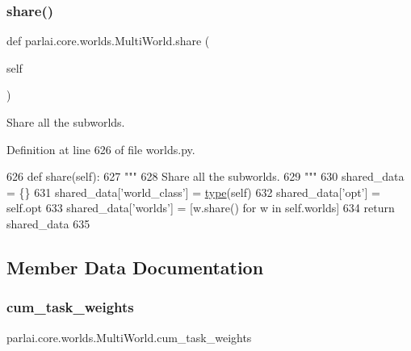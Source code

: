 \subsubsection{\texorpdfstring{share()}{share()}}
{\footnotesize\ttfamily def parlai.\+core.\+worlds.\+Multi\+World.\+share (\begin{DoxyParamCaption}\item[{}]{self }\end{DoxyParamCaption})}

\begin{DoxyVerb}Share all the subworlds.
\end{DoxyVerb}
 

Definition at line 626 of file worlds.\+py.


\begin{DoxyCode}
626     \textcolor{keyword}{def }share(self):
627         \textcolor{stringliteral}{"""}
628 \textcolor{stringliteral}{        Share all the subworlds.}
629 \textcolor{stringliteral}{        """}
630         shared\_data = \{\}
631         shared\_data[\textcolor{stringliteral}{'world\_class'}] = \hyperlink{namespaceparlai_1_1agents_1_1tfidf__retriever_1_1build__tfidf_ad5dfae268e23f506da084a9efb72f619}{type}(self)
632         shared\_data[\textcolor{stringliteral}{'opt'}] = self.opt
633         shared\_data[\textcolor{stringliteral}{'worlds'}] = [w.share() \textcolor{keywordflow}{for} w \textcolor{keywordflow}{in} self.worlds]
634         \textcolor{keywordflow}{return} shared\_data
635 
\end{DoxyCode}


\subsection{Member Data Documentation}
\mbox{\label{classparlai_1_1core_1_1worlds_1_1MultiWorld_aa4264dd13f5d8e7f7883e3afd6d726e7}} 
\subsubsection{\texorpdfstring{cum\+\_\+task\+\_\+weights}{cum\_task\_weights}}
{\footnotesize\ttfamily parlai.\+core.\+worlds.\+Multi\+World.\+cum\+\_\+task\+\_\+weights}



